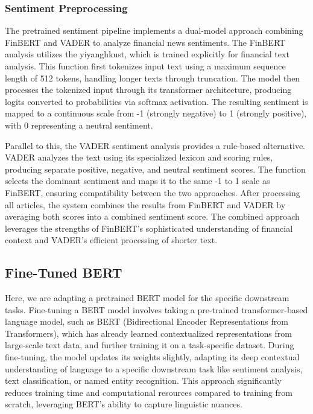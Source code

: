 \documentclass[12pt]{article}
\begin{document}
\subsubsection*{Sentiment Preprocessing}

The pretrained sentiment pipeline implements a dual-model approach combining FinBERT and VADER to analyze financial news sentiments. The FinBERT analysis utilizes the yiyanghkust, which is trained explicitly for financial text analysis. This function first tokenizes input text using a maximum sequence length of 512 tokens, handling longer texts through truncation. The model then processes the tokenized input through its transformer architecture, producing logits converted to probabilities via softmax activation. The resulting sentiment is mapped to a continuous scale from -1 (strongly negative) to 1 (strongly positive), with 0 representing a neutral sentiment.

Parallel to this, the VADER sentiment analysis provides a rule-based alternative. VADER analyzes the text using its specialized lexicon and scoring rules, producing separate positive, negative, and neutral sentiment scores. The function selects the dominant sentiment and maps it to the same -1 to 1 scale as FinBERT, ensuring compatibility between the two approaches. After processing all articles, the system combines the results from FinBERT and VADER by averaging both scores into a combined sentiment score. The combined approach leverages the strengths of FinBERT's sophisticated understanding of financial context and VADER's efficient processing of shorter text.

\subsection*{Fine-Tuned BERT}

Here, we are adapting a pretrained BERT model for the specific downstream tasks. Fine-tuning a BERT model involves taking a pre-trained transformer-based language model, such as BERT (Bidirectional Encoder Representations from Transformers), which has already learned contextualized representations from large-scale text data, and further training it on a task-specific dataset. During fine-tuning, the model updates its weights slightly, adapting its deep contextual understanding of language to a specific downstream task like sentiment analysis, text classification, or named entity recognition. This approach significantly reduces training time and computational resources compared to training from scratch, leveraging BERT's ability to capture linguistic nuances.
\end{document}
